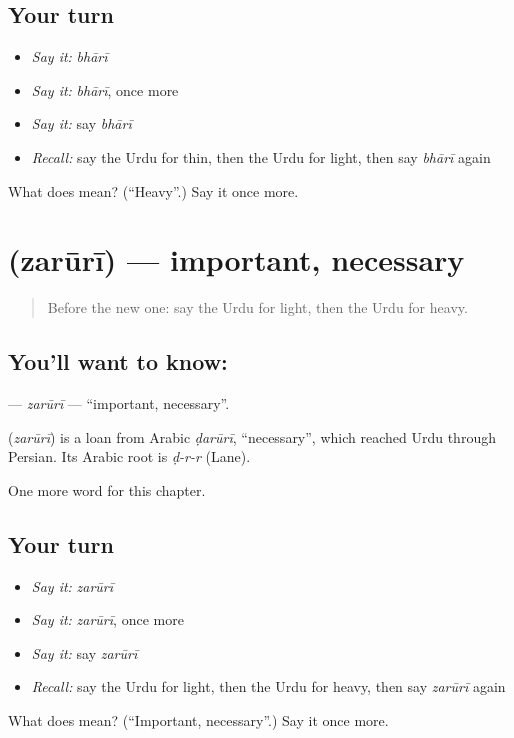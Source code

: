 \subsection*{Your turn}
\begin{itemize}
\raggedright
  \item \emph{Say it:} \emph{bhārī}
  \item \emph{Say it:} \emph{bhārī}, once more
  \item \emph{Say it:} say \emph{bhārī}
  \item \emph{Recall:} say the Urdu for thin, then the Urdu for light, then say \emph{bhārī} again
\end{itemize}

\begin{tcolorbox}[breakable,colback=teal!4,colframe=teal!35!black,title={Before you move on}]
What does  mean? (\textquotedblleft{}Heavy\textquotedblright{}.) Say it once more.
\end{tcolorbox}
\section[\texorpdfstring{\ur{ضروری} (zarūrī)}{ضروری (zarūrī)}]{ (zarūrī) — important, necessary}

\label{lesson:UR-C73-zaruri}



\begin{quote}
Before the new one: say the Urdu for light, then the Urdu for heavy.
\end{quote}

\subsection*{You'll want to know: }
\textbf{} — \emph{zarūrī} — \textquotedblleft{}important, necessary\textquotedblright{}.

\begin{cousinweb}
\textbf{} (\emph{zarūrī}) is a loan from Arabic \emph{ḍarūrī}, \textquotedblleft{}necessary\textquotedblright{}, which reached Urdu through Persian. Its Arabic root is \emph{ḍ-r-r} (Lane).
\end{cousinweb}

\begin{grammarlens}[title={What you've built}]
One more word for this chapter.
\end{grammarlens}

\subsection*{Your turn}
\begin{itemize}
\raggedright
  \item \emph{Say it:} \emph{zarūrī}
  \item \emph{Say it:} \emph{zarūrī}, once more
  \item \emph{Say it:} say \emph{zarūrī}
  \item \emph{Recall:} say the Urdu for light, then the Urdu for heavy, then say \emph{zarūrī} again
\end{itemize}

\begin{tcolorbox}[breakable,colback=teal!4,colframe=teal!35!black,title={Before you move on}]
What does  mean? (\textquotedblleft{}Important, necessary\textquotedblright{}.) Say it once more.
\end{tcolorbox}
